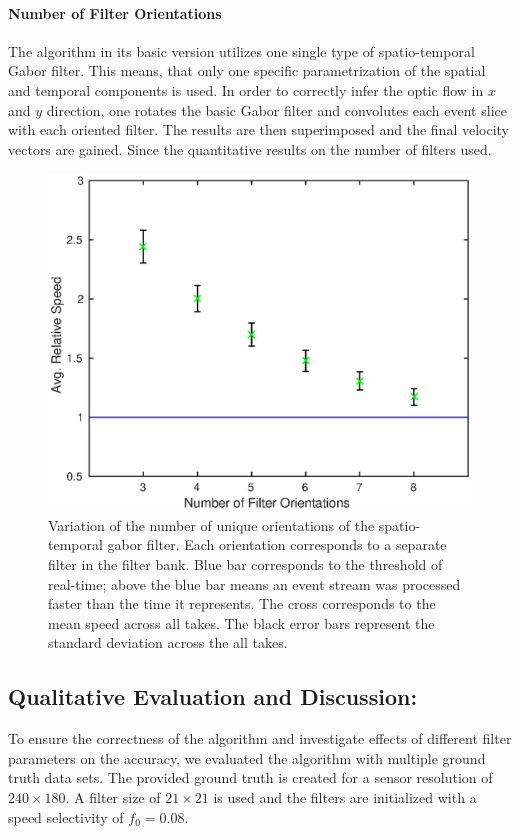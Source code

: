 \paragraph{Number of Filter Orientations}
The algorithm in its basic version utilizes one single type of spatio-temporal Gabor filter.
This means, that only one specific parametrization of the spatial and temporal components is used.
In order to correctly infer the optic flow in $x$ and $y$ direction, one rotates the basic Gabor filter and convolutes each event slice with each oriented filter.
The results are then superimposed and the final velocity vectors are gained.
Since the quantitative results on the number of filters used.
\begin{figure}[!htb]
	\centering
	\includegraphics[scale=.9]{gpu_fo.eps}
	\caption{Variation of the number of unique orientations of the spatio-temporal gabor filter. Each orientation corresponds to a separate filter in the filter bank. Blue bar corresponds to the threshold of real-time; above the blue bar means an event stream was processed faster than the time it represents. The cross corresponds to the mean speed across all takes. The black error bars represent the standard deviation across the all takes.}
	\label{fig:gpu_fo}
\end{figure}

\subsection{Qualitative Evaluation and Discussion:} 
To ensure the correctness of the algorithm and investigate effects of different filter parameters on the accuracy, we evaluated the algorithm with multiple ground truth data sets.
The provided ground truth is created for a sensor resolution of $240\times180$.
A filter size of $21\times21$ is used and the filters are initialized with a speed selectivity of $f_0=0.08$.


